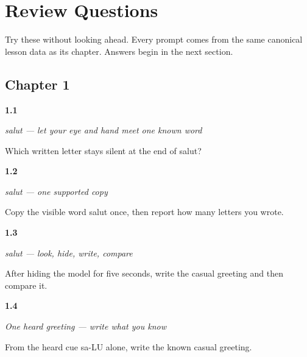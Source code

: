 
\chapter*{Review Questions}

Try these without looking ahead. Every prompt comes from the same canonical lesson data as its chapter. Answers begin in the next section.

\section*{Chapter 1}

\noindent\begin{minipage}[t]{\linewidth}
\raggedright
\hypertarget{review-FR-W01-salut-observe-final}{\textbf{1.1}} \emph{\emph{salut} — let your eye and hand meet one known word}\par
\small Which written letter stays silent at the end of salut?
\end{minipage}\par\medskip

\noindent\begin{minipage}[t]{\linewidth}
\raggedright
\hypertarget{review-FR-W01-salut-guided-copy-check}{\textbf{1.2}} \emph{\emph{salut} — one supported copy}\par
\small Copy the visible word salut once, then report how many letters you wrote.
\end{minipage}\par\medskip

\noindent\begin{minipage}[t]{\linewidth}
\raggedright
\hypertarget{review-FR-W01-salut-delayed-copy-check}{\textbf{1.3}} \emph{\emph{salut} — look, hide, write, compare}\par
\small After hiding the model for five seconds, write the casual greeting and then compare it.
\end{minipage}\par\medskip

\noindent\begin{minipage}[t]{\linewidth}
\raggedright
\hypertarget{review-FR-W01-salut-dictation-answer}{\textbf{1.4}} \emph{One heard greeting — write what you know}\par
\small From the heard cue sa-LU alone, write the known casual greeting.
\end{minipage}\par\medskip


